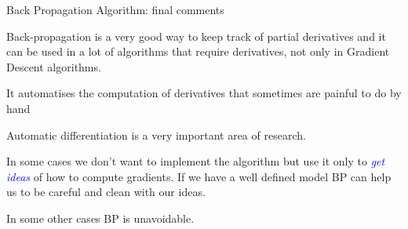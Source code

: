 \documentclass[9pt,xcolor=table]{beamer}
\begin{document}
\begin{frame}{Back Propagation Algorithm: final comments}
	
	\begin{witemize}
		\item Back-propagation is a very good way to keep track of partial derivatives and it can be used in a lot of algorithms that require derivatives, not only in Gradient Descent algorithms.
		
		\item It automatises the computation of derivatives that sometimes are painful to do by hand
		
		\item Automatic differentiation is a very important area of research.
		
		\item In some cases we don't want to implement the algorithm but use it only to \textit{\textcolor{blue}{get ideas}} of how to compute gradients. If we have a well defined model BP can help us to be careful and clean with our ideas.
		
		\item In some other cases BP is unavoidable.
	\end{witemize}
	
\end{frame}
\end{document}
